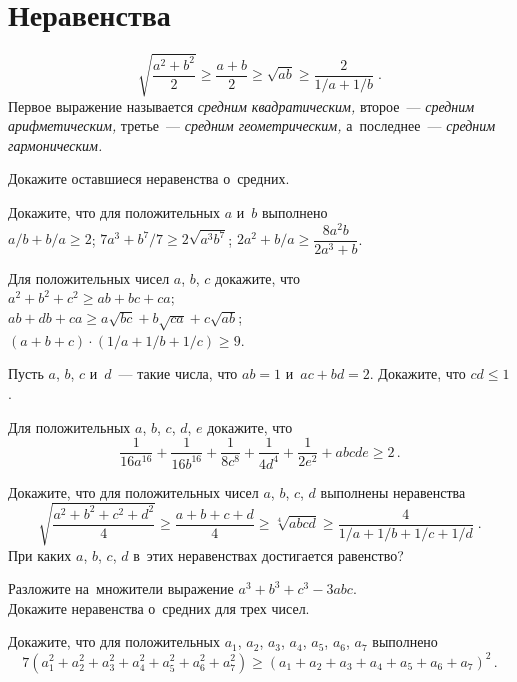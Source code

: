 
\section*{Неравенства}


\[
    \sqrt{\frac{a^2 + b^2}{2}}
\geq
    \frac{a + b}{2}
\geq
    \sqrt{a b}
\geq
    \frac{2}{1 / a + 1 / b}
\; . \]
Первое выражение называется \emph{средним квадратическим,}
второе~--- \emph{средним арифметическим,}
третье~--- \emph{средним геометрическим,}
а~последнее~--- \emph{средним гармоническим.}

\begin{problems}

\item
Докажите оставшиеся неравенства о~средних.

\item
Докажите, что для положительных $a$ и~$b$ выполнено
\\
\subproblem
$a / b + b / a \geq 2$;
\qquad
\subproblem
$7 a^3 + b^7 / 7 \geq 2 \sqrt{a^3 b^7}$;
\qquad
\subproblem
$2 a^2 + b / a \geq \dfrac{8 a^2 b}{2 a^3 + b}$.

\item
Для положительных чисел $a$, $b$, $c$ докажите, что
\\
\subproblem
$a^2 + b^2 + c^2 \geq a b + b c + c a$;
\\
\subproblem
$a b + d b + c a \geq a \sqrt{b c} + b \sqrt{c a} + c \sqrt{a b}$;
\\
\subproblem
$(a + b + c) \cdot (1 / a + 1 / b + 1 / c) \geq 9$.

\item
Пусть $a$, $b$, $c$ и~$d$~--- такие числа, что $a b = 1$ и~$a c + b d = 2$.
Докажите, что $c d \leq 1$.

\item
Для положительных $a$, $b$, $c$, $d$, $e$ докажите, что
\[
    \frac{1}{16 a^{16}} + \frac{1}{16 b^{16}} +
    \frac{1}{8 c^{8}} + \frac{1}{4 d^{4}} + \frac{1}{2 e^{2}} +
    a b c d e
\geq
    2
\, . \]

\item
Докажите, что для положительных чисел $a$, $b$, $c$, $d$ выполнены неравенства
\[
    \sqrt{\frac{a^2 + b^2 + c^2 + d^2}{4}}
\geq
    \frac{a + b + c + d}{4}
\geq
    \sqrt[4]{a b c d}
\geq
    \frac{4}{1 / a + 1 / b + 1 / c + 1 / d}
\; . \]
При каких $a$, $b$, $c$, $d$ в~этих неравенствах достигается равенство?

\item
\subproblem
Разложите на~множители выражение $a^3 + b^3 + c^3 - 3 a b c$.
\\
\subproblem
Докажите неравенства о~средних для трех чисел.

\item
Докажите, что для положительных $a_1$, $a_2$, $a_3$, $a_4$, $a_5$, $a_6$, $a_7$
выполнено
\[
    7 (a_1^2 + a_2^2 + a_3^2 + a_4^2 + a_5^2 + a_6^2 + a_7^2)
\geq
    (a_1 + a_2 + a_3 + a_4 + a_5 + a_6 + a_7)^2
\, . \]

\end{problems}

